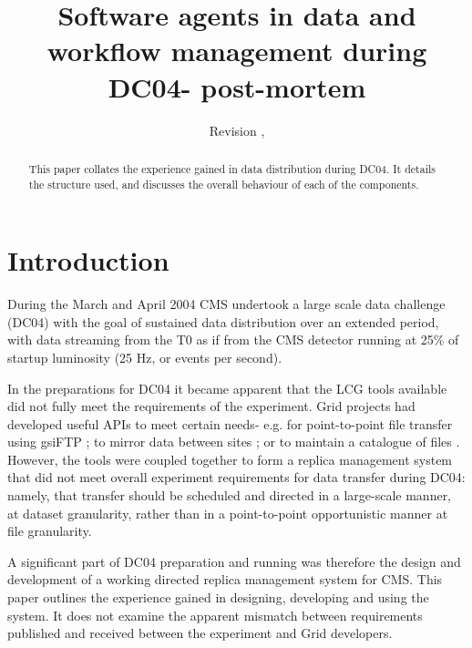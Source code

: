 \documentclass{cmspaper}
\begin{document}
\begin{titlepage}
  \date{Revision \RCSRevision, \RCSDate}
  \title{Software agents in data and workflow management during DC04- post-mortem}

  \begin{Authlist}
  \end{Authlist}


  \begin{abstract}
	This paper collates the experience gained in data distribution during
	DC04. It details the structure used, and discusses the overall behaviour
	of each of the components.
  \end{abstract} 

\end{titlepage}

\setcounter{page}{2}

\section{Introduction}
During the March and April 2004 CMS undertook a large scale data
challenge (DC04) with the goal of sustained data distribution over an
extended period, with data streaming from the T0 as if from the CMS
detector running at 25\% of startup luminosity (25 Hz, or events per
second).

In the preparations for DC04 it became apparent that the LCG tools
available did not fully meet the requirements of the experiment. Grid
projects had developed useful APIs to meet certain needs- e.g. for
point-to-point file transfer using gsiFTP \cite{rmapi}; to mirror data
between sites \cite{gdmp}; or to maintain a catalogue of files
\cite{rls}. However, the tools were coupled together to form a replica
management system that did not meet overall experiment requirements
for data transfer during DC04: namely, that transfer should be
scheduled and directed in a large-scale manner, at dataset
granularity, rather than in a point-to-point opportunistic manner at
file granularity.

A significant part of DC04 preparation and running was therefore the
design and development of a working directed replica management system
for CMS. This paper outlines the experience gained in designing,
developing and using the system. It does not examine the apparent
mismatch between requirements published and received between the
experiment and Grid developers.
\end{document}
